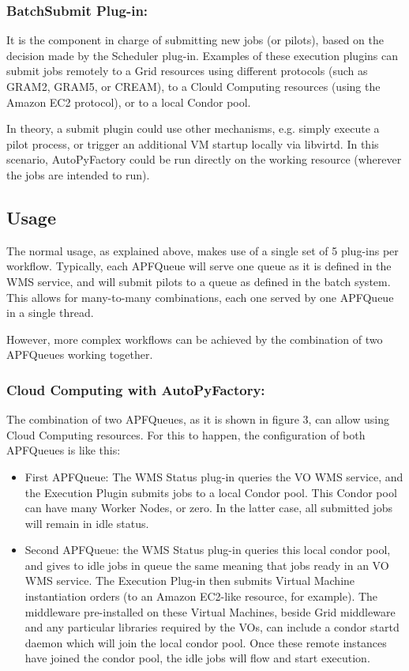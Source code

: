 \documentclass[a4paper]{jpconf}
\begin{document}
\subsubsection{BatchSubmit Plug-in:}
It is the component in charge of submitting new jobs (or pilots), 
based on the decision made by the Scheduler plug-in. 
Examples of these execution plugins can submit jobs remotely to a Grid resources using different protocols 
(such as GRAM2, GRAM5, or CREAM), to a Clould Computing resources (using the
Amazon EC2 protocol), or to a local Condor pool. 

In theory, a submit plugin
could use other mechanisms, e.g. simply execute a pilot process, or trigger an
additional VM startup locally via libvirtd. In this scenario, AutoPyFactory could be run
directly on the working resource (wherever the jobs are intended to run).


\subsection{Usage}

The normal usage, as explained above, 
makes use of a single set of 5 plug-ins per workflow. 
Typically, each APFQueue will serve one queue as it is defined in the WMS service, 
and will submit pilots to a queue as defined in the batch system. 
This allows for many-to-many combinations, each one served by one APFQueue in a single thread. 

However, more complex workflows can be achieved by the combination of two APFQueues working together.

\subsubsection{Cloud Computing with AutoPyFactory:}
The combination of two APFQueues, 
as it is shown in figure 3, 
can allow using Cloud Computing resources. 
For this to happen, the configuration of both APFQueues is like this:

\begin{itemize}
\item First APFQueue: 
The WMS Status plug-in queries the VO WMS service, and the Execution Plugin
submits jobs  to a local Condor pool.
This Condor pool can have many Worker Nodes, or zero. 
In the latter case, all submitted jobs will remain in idle status. 
\item Second APFQueue: 
the WMS Status plug-in queries this local condor pool, 
and gives to idle jobs in queue the same meaning that jobs ready in an VO WMS service. 
The Execution Plug-in then submits Virtual Machine instantiation orders (to an Amazon EC2-like resource, for example). 
The middleware pre-installed on these Virtual Machines, 
beside Grid middleware and any particular libraries required by the VOs, 
can include a condor startd daemon which will join the local condor pool. 
Once these remote instances have joined the condor pool, 
the idle jobs will flow and start execution. 
\end{itemize}
\end{document}
